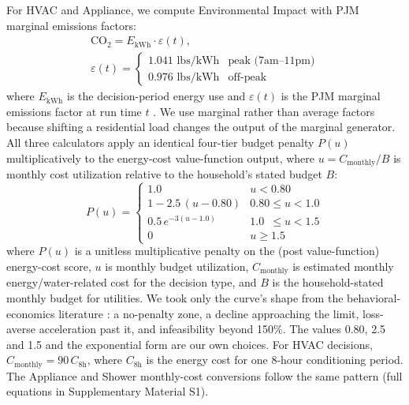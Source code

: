 \documentclass[final,3p,times]{elsarticle}
\begin{document}
For HVAC and Appliance, we compute Environmental Impact with PJM marginal emissions factors:
\begin{equation}
\begin{gathered}
  \mathrm{CO_2} = E_{\mathrm{kWh}} \cdot \varepsilon(t), \\[4pt]
  \varepsilon(t) = \begin{cases}
    1.041 \text{ lbs/kWh} & \text{peak (7am--11pm)} \\
    0.976 \text{ lbs/kWh} & \text{off-peak}
  \end{cases}
\end{gathered}
  \label{eq:emissions}
\end{equation}
\noindent where $E_{\mathrm{kWh}}$ is the decision-period energy use and $\varepsilon(t)$ is the PJM marginal emissions factor at run time $t$ \cite{pjm2022emissions}. We use marginal rather than average factors because shifting a residential load changes the output of the marginal generator.
All three calculators apply an identical four-tier budget penalty $P(u)$ multiplicatively to the energy-cost value-function output, where $u = C_{\mathrm{monthly}} / B$ is monthly cost utilization relative to the household's stated budget $B$:
\begin{equation}
  P(u) = \begin{cases}
    1.0                          & u < 0.80                   \\[4pt]
    1 - 2.5\,(u - 0.80)         & 0.80 \le u < 1.0           \\[4pt]
    0.5\,e^{-3(u - 1.0)}        & 1.0 \phantom{0}\le u < 1.5 \\[4pt]
    0                            & u \ge 1.5
  \end{cases}
  \label{eq:budget_penalty}
\end{equation}
\noindent where $P(u)$ is a unitless multiplicative penalty on the (post value-function) energy-cost score, $u$ is monthly budget utilization, $C_{\mathrm{monthly}}$ is estimated monthly energy/water-related cost for the decision type, and $B$ is the household-stated monthly budget for utilities.
\noindent We took only the curve's shape from the behavioral-economics literature \cite{thaler1999,heath1996,prelec1998,gathergood2012}: a no-penalty zone, a decline approaching the limit, loss-averse acceleration past it, and infeasibility beyond 150\%. The values 0.80, 2.5 and 1.5 and the exponential form are our own choices. For HVAC decisions, $C_{\mathrm{monthly}} = 90\,C_{\mathrm{8h}}$, where $C_{\mathrm{8h}}$ is the energy cost for one 8-hour conditioning period. The Appliance and Shower monthly-cost conversions follow the same pattern (full equations in Supplementary Material S1).
\end{document}
